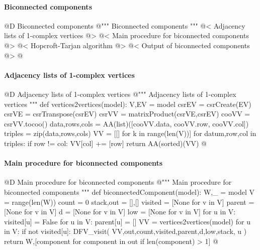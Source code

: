 \documentclass[11pt,oneside]{article}    %
\begin{document}
\paragraph{Biconnected components}
@D Biconnected components
@{""" Biconnected components """
@< Adjacency lists of 1-complex vertices @>
@< Main procedure for biconnected components @>
@< Hopcroft-Tarjan algorithm @>
@< Output of biconnected components @>
@}



\paragraph{Adjacency lists of 1-complex vertices}
@D Adjacency lists of 1-complex vertices
@{""" Adjacency lists of 1-complex vertices """
def vertices2vertices(model):
    V,EV = model
    csrEV = csrCreate(EV)
    csrVE = csrTranspose(csrEV)
    csrVV = matrixProduct(csrVE,csrEV)    
    cooVV = csrVV.tocoo()
    data,rows,cols = AA(list)([cooVV.data, cooVV.row, cooVV.col])
    triples = zip(data,rows,cols)
    VV = [[] for k in range(len(V))]
    for datum,row,col in triples:
        if row != col: VV[col] += [row]
    return AA(sorted)(VV)
@}


\paragraph{Main procedure for biconnected components}
@D Main procedure for biconnected components
@{""" Main procedure for biconnected components """
def biconnectedComponent(model):
    W,_ = model
    V = range(len(W))
    count = 0
    stack,out = [],[]
    visited = [None for v in V]
    parent = [None for v in V]
    d = [None for v in V]
    low = [None for v in V]
    for u in V: visited[u] = False
    for u in V: parent[u] = []
    VV = vertices2vertices(model)
    for u in V: 
        if not visited[u]: 
            DFV_visit( VV,out,count,visited,parent,d,low,stack, u )
    return W,[component for component in out if len(component) > 1]
@}
\end{document}
